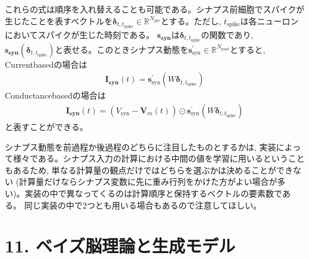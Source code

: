 \documentclass[letterpaper,10pt,english]{sphinxmanual}
\begin{document}
これらの式は順序を入れ替えることも可能である。シナプス前細胞でスパイクが生じたことを表すベクトルを\(\boldsymbol{\delta}_{t,t_{\text{spike}}}\in \mathbb{R}^{N_{\text{pre}}}\)とする。ただし, \(t_{\text{spike}}\)は各ニューロンにおいてスパイクが生じた時刻である。 \(\boldsymbol{s_{\text{syn}}}\)は\(\boldsymbol{\delta}_{t,t_{\text{spike}}}\)の関数であり, \(\boldsymbol{s_{\text{syn}}}(\boldsymbol{\delta}_{t,t_{\text{spike}}})\)と表せる。このときシナプス動態を\(\boldsymbol{s}^\prime_{\text{syn}}\in \mathbb{R}^{N_{\text{post}}}\)とすると, Current\sphinxhyphen{}basedの場合は
\begin{equation*}
\begin{split}
\begin{equation}
\boldsymbol{I_{\text{syn}}}(t)=\boldsymbol{s}^\prime_{\text{syn}}(W\boldsymbol{\delta}_{t,t_{\text{spike}}})  
\end{equation}
\end{split}
\end{equation*}
Conductance\sphinxhyphen{}basedの場合は
\begin{equation*}
\begin{split}
\begin{equation}
\boldsymbol{I_{\text{syn}}}(t)=\left(V_{\text{syn}}-\boldsymbol{V}_{m}(t)\right)\odot \boldsymbol{s}^\prime_{\text{syn}}(W\boldsymbol{\delta}_{t,t_{\text{spike}}})
\end{equation}
\end{split}
\end{equation*}
と表すことができる。

シナプス動態を前過程か後過程のどちらに注目したものとするかは, 実装によって様々である。シナプス入力の計算における中間の値を学習に用いるということもあるため, 単なる計算量の観点だけではどちらを選ぶかは決めることができない (計算量だけならシナプス変数に先に重み行列をかけた方がよい場合が多い)。実装の中で異なってくるのは計算順序と保持するベクトルの要素数である。 同じ実装の中で2つとも用いる場合もあるので注意してほしい。


\section{11. ベイズ脳理論と生成モデル}
\label{\detokenize{11_intro:id1}}\label{\detokenize{11_intro::doc}}
\end{document}
